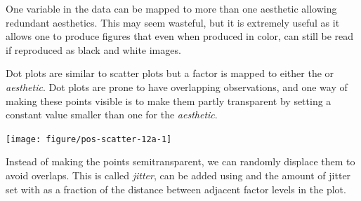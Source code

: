 \documentclass[krantz2]{krantz}\usepackage{knitr}%
\begin{document}
\begin{infobox}
  One variable in the data can be mapped to more than one aesthetic allowing redundant aesthetics. This may seem wasteful, but it is extremely useful as it allows one to produce figures that even when produced in color, can still be read if reproduced as black and white images.

\begin{knitrout}\footnotesize
{}\color{fgcolor}\begin{kframe}
\begin{alltt}
\hlstd{(}  \hlstd{(}   
                           \hlstd{=} 
                           \hlstd{=}  \hlopt{+}
  \hlstd{()}
\end{alltt}
\end{kframe}
\end{knitrout}
\end{infobox}

Dot plots are similar to scatter plots but a factor is mapped to either the  or  \emph{aesthetic}. Dot plots are prone to have overlapping observations, and one way of making these points visible is to make them partly transparent by setting a constant value smaller than one for the  \emph{aesthetic}.

\begin{knitrout}\footnotesize
{}\color{fgcolor}\begin{kframe}
\begin{alltt}
\hlstd{(}  \hlstd{(} \hlstd{=}    \hlopt{+}
  \hlstd{(} \hlstd{=} \hlopt{/}\hlstd{)}
\end{alltt}
\end{kframe}

{\centering \texttt{[image: figure/pos-scatter-12a-1]} 

}



\end{knitrout}

Instead of making the points semitransparent, we can randomly displace them to avoid overlaps. This is called \emph{jitter}, can be added using  and the amount of jitter set with  as a fraction of the distance between adjacent factor levels in the plot.
\end{document}
